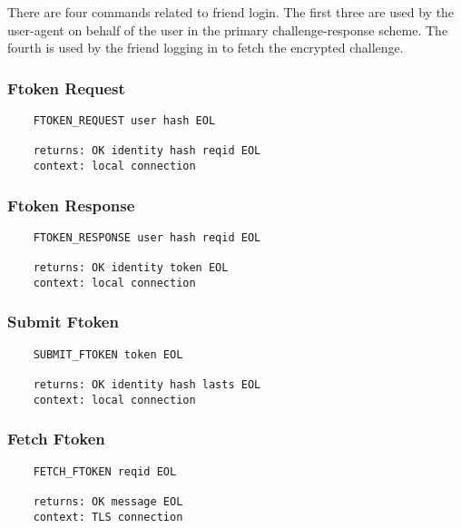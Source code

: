 \documentclass[letterpaper,11pt,oneside]{article}
\begin{document}
There are four commands related to friend login. The first three are used by
the user-agent on behalf of the user in the primary challenge-response scheme.
The fourth is used by the friend logging in to fetch the encrypted challenge.

\subsubsection{Ftoken Request}

\vspace{10pt}
\begin{verbatim}
    FTOKEN_REQUEST user hash EOL 

    returns: OK identity hash reqid EOL
    context: local connection
\end{verbatim}
\vspace{10pt}

\subsubsection{Ftoken Response}

\vspace{10pt}
\begin{verbatim}
    FTOKEN_RESPONSE user hash reqid EOL 

    returns: OK identity token EOL
    context: local connection
\end{verbatim}
\vspace{10pt}

\subsubsection{Submit Ftoken}

\vspace{10pt}
\begin{verbatim}
    SUBMIT_FTOKEN token EOL 

    returns: OK identity hash lasts EOL
    context: local connection
\end{verbatim}
\vspace{10pt}

\subsubsection{Fetch Ftoken}

\vspace{10pt}
\begin{verbatim}
    FETCH_FTOKEN reqid EOL

    returns: OK message EOL
    context: TLS connection
\end{verbatim}
\end{document}
